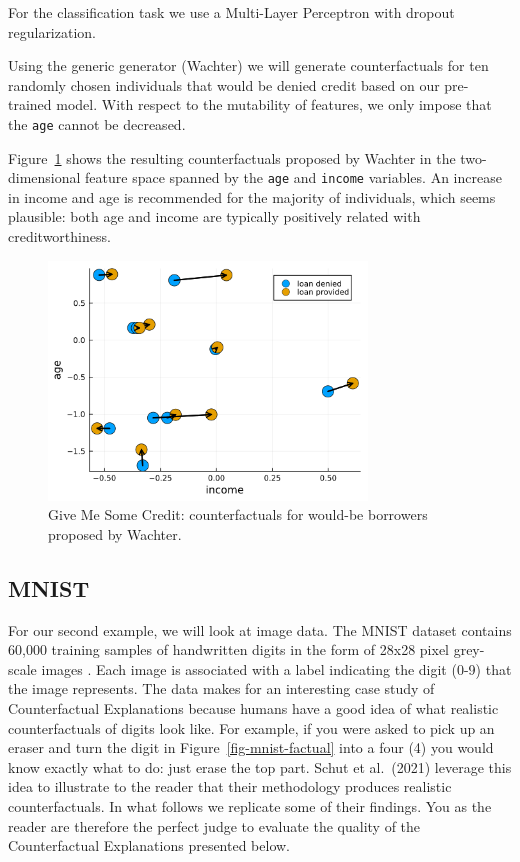 \documentclass{juliacon}
\begin{document}
For the classification task we use a Multi-Layer Perceptron with dropout
regularization.

Using the generic generator (Wachter) we will generate counterfactuals
for ten randomly chosen individuals that would be denied credit based on
our pre-trained model. With respect to the mutability of features, we
only impose that the \texttt{age} cannot be decreased.

Figure~\ref{fig-credit} shows the resulting counterfactuals proposed by
Wachter in the two-dimensional feature space spanned by the \texttt{age}
and \texttt{income} variables. An increase in income and age is
recommended for the majority of individuals, which seems plausible: both
age and income are typically positively related with creditworthiness.

\begin{figure}

{\centering \includegraphics[width=3.33333in,height=2.5in]{www/credit.png}

}

\caption{\label{fig-credit}Give Me Some Credit: counterfactuals for
would-be borrowers proposed by Wachter.}

\end{figure}

\hypertarget{mnist}{%
\subsection{MNIST}\label{mnist}}

For our second example, we will look at image data. The MNIST dataset
contains 60,000 training samples of handwritten digits in the form of
28x28 pixel grey-scale images \cite{lecun1998mnist}. Each image is
associated with a label indicating the digit (0-9) that the image
represents. The data makes for an interesting case study of
Counterfactual Explanations because humans have a good idea of what
realistic counterfactuals of digits look like. For example, if you were
asked to pick up an eraser and turn the digit in
Figure~\ref{fig-mnist-factual} into a four (4) you would know exactly
what to do: just erase the top part. Schut et al.~(2021)
\cite{schut2021generating} leverage this idea to illustrate to the
reader that their methodology produces realistic counterfactuals. In
what follows we replicate some of their findings. You as the reader are
therefore the perfect judge to evaluate the quality of the
Counterfactual Explanations presented below.
\end{document}
